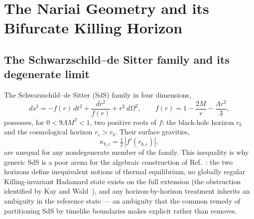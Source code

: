 \documentclass[11pt]{article}
\newcommand{\Nariai}{Nariai}
\begin{document}
\section{The \Nariai{} Geometry and its Bifurcate Killing Horizon}
\label{sec:geometry}

\subsection{The Schwarzschild--de Sitter family and its degenerate limit}

The Schwarzschild--de Sitter (SdS) family in four dimensions,
\begin{equation}
ds^2 = -f(r)\,dt^2 + \frac{dr^2}{f(r)} + r^2\, d\Omega^2,
\qquad
f(r) = 1 - \frac{2M}{r} - \frac{\Lambda r^2}{3},
\label{eq:SdS}
\end{equation}
possesses, for $0 < 9\Lambda M^2 < 1$, two positive roots of $f$: the black-hole horizon $r_b$ and the cosmological horizon $r_c > r_b$. Their surface gravities,
\begin{equation}
\kappa_{b,c} = \tfrac{1}{2}\,|f'(r_{b,c})|,
\end{equation}
are unequal for any nondegenerate member of the family. This inequality is why generic SdS is a poor arena for the algebraic construction of Ref.~\cite{DorauMuch}: the two horizons define inequivalent notions of thermal equilibrium, no globally regular Killing-invariant Hadamard state exists on the full extension (the obstruction identified by Kay and Wald~\cite{KayWald}), and any horizon-by-horizon treatment inherits an ambiguity in the reference state --- an ambiguity that the common remedy of partitioning SdS by timelike boundaries \cite{Rusalev} makes explicit rather than removes.
\end{document}
